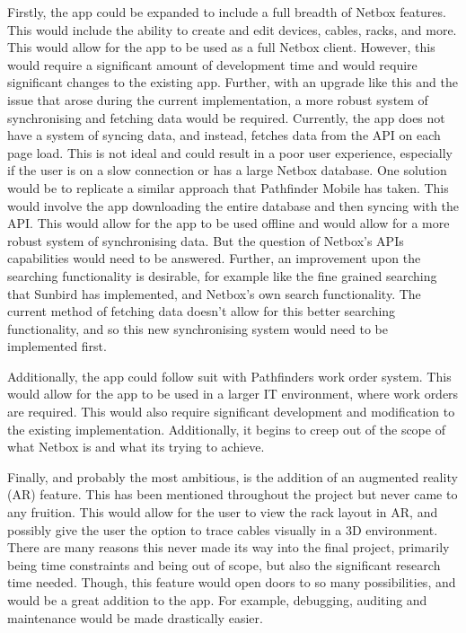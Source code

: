 \documentclass [11pt,a4paper]{article}
\begin{document}
Firstly, the app could be expanded to include a full breadth of Netbox features. This would include the ability to create and edit devices, cables, racks, and more. This would allow for the app to be used as a full Netbox client. However, this would require a significant amount of development time and would require significant changes to the existing app. Further, with an upgrade like this and the issue that arose during the current implementation, a more robust system of synchronising and fetching data would be required. Currently, the app does not have a system of syncing data, and instead, fetches data from the API on each page load. This is not ideal and could result in a poor user experience, especially if the user is on a slow connection or has a large Netbox database. One solution would be to replicate a similar approach that Pathfinder Mobile has taken. This would involve the app downloading the entire database and then syncing with the API. This would allow for the app to be used offline and would allow for a more robust system of synchronising data. But the question of Netbox's APIs capabilities would need to be answered. Further, an improvement upon the searching functionality is desirable, for example like the fine grained searching that Sunbird has implemented, and Netbox's own search functionality. The current method of fetching data doesn't allow for this better searching functionality, and so this new synchronising system would need to be implemented first.

Additionally, the app could follow suit with Pathfinders work order system. This would allow for the app to be used in a larger IT environment, where work orders are required. This would also require significant development and modification to the existing implementation. Additionally, it begins to creep out of the scope of what Netbox is and what its trying to achieve.

Finally, and probably the most ambitious, is the addition of an augmented reality (AR) feature. This has been mentioned throughout the project but never came to any fruition. This would allow for the user to view the rack layout in AR, and possibly give the user the option to trace cables visually in a 3D environment. There are many reasons this never made its way into the final project, primarily being time constraints and being out of scope, but also the significant research time needed. Though, this feature would open doors to so many possibilities, and would be a great addition to the app. For example, debugging, auditing and maintenance would be made drastically easier. 
\end{document}
